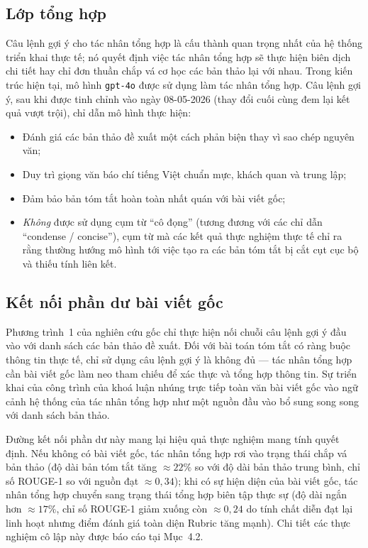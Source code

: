 \subsection{Lớp tổng hợp}

Câu lệnh gợi ý cho tác nhân tổng hợp là cấu thành quan trọng nhất của hệ thống triển khai thực tế; 
nó quyết định việc tác nhân tổng hợp sẽ thực hiện biên dịch chi tiết hay chỉ đơn thuần chắp vá cơ học các bản thảo lại với nhau. 
Trong kiến trúc hiện tại, mô hình \texttt{gpt-4o} được sử dụng làm tác nhân tổng hợp. 
Câu lệnh gợi ý, sau khi được tinh chỉnh vào ngày 08-05-2026 (thay đổi cuối cùng đem lại kết quả vượt trội), chỉ dẫn mô hình thực hiện:
\begin{itemize}
  \item Đánh giá các bản thảo đề xuất một cách phản biện thay vì sao chép nguyên văn;
  \item Duy trì giọng văn báo chí tiếng Việt chuẩn mực, khách quan và trung lập;
  \item Đảm bảo bản tóm tắt hoàn toàn nhất quán với bài viết gốc;
  \item \textit{Không} được sử dụng cụm từ ``cô đọng'' (tương đương với các chỉ dẫn ``condense / concise''), cụm từ mà các kết quả thực nghiệm thực tế chỉ ra rằng thường hướng mô hình tới việc tạo ra các bản tóm tắt bị cắt cụt cục bộ và thiếu tính liên kết.
\end{itemize}

\subsection{Kết nối phần dư bài viết gốc}

Phương trình~1 của nghiên cứu gốc \cite{Wang2024} chỉ thực hiện nối chuỗi câu lệnh gợi ý đầu vào với danh sách các bản thảo đề xuất. 
Đối với bài toán tóm tắt có ràng buộc thông tin thực tế, chỉ sử dụng câu lệnh gợi ý là không đủ — tác nhân tổng hợp cần bài viết gốc làm neo tham chiếu để xác thực và tổng hợp thông tin. 
Sự triển khai của công trình của khoá luận nhúng trực tiếp toàn văn bài viết gốc vào ngữ cảnh hệ thống của tác nhân tổng hợp như một nguồn đầu vào bổ sung song song với danh sách bản thảo. 

Đường kết nối phần dư này mang lại hiệu quả thực nghiệm mang tính quyết định. 
Nếu không có bài viết gốc, tác nhân tổng hợp rơi vào trạng thái chắp vá bản thảo (độ dài bản tóm tắt tăng $\approx 22\%$ so với độ dài bản thảo trung bình, chỉ số ROUGE-1 so với nguồn đạt $\approx 0{,}34$); 
khi có sự hiện diện của bài viết gốc, tác nhân tổng hợp chuyển sang trạng thái tổng hợp biên tập thực sự (độ dài ngắn hơn $\approx 17\%$, chỉ số ROUGE-1 giảm xuống còn $\approx 0{,}24$ do tính chất diễn đạt lại linh hoạt nhưng điểm đánh giá toàn diện Rubric tăng mạnh). 
Chi tiết các thực nghiệm cô lập này được báo cáo tại Mục~4.2.

